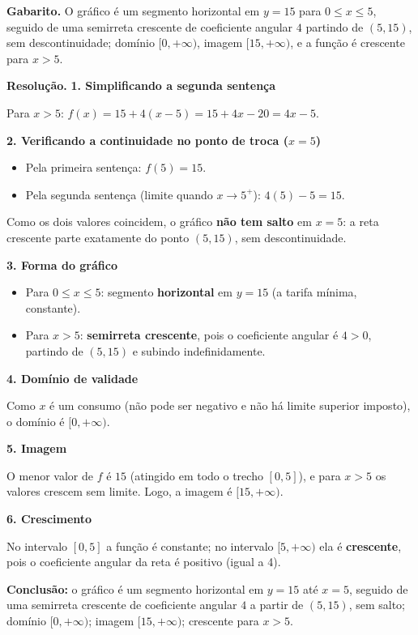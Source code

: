 \documentclass[11pt,a4paper]{article}
\begin{document}
\textbf{Gabarito.} O gráfico é um segmento horizontal em $y=15$ para $0\le x\le 5$, seguido de uma semirreta crescente de coeficiente angular $4$ partindo de $(5,15)$, sem descontinuidade; domínio $[0,+\infty)$, imagem $[15,+\infty)$, e a função é crescente para $x>5$.

\textbf{Resolução.} \textbf{1. Simplificando a segunda sentença}

Para $x>5$: $f(x) = 15 + 4(x-5) = 15 + 4x - 20 = 4x - 5$.

\textbf{2. Verificando a continuidade no ponto de troca ($x=5$)}

\begin{itemize}[nosep,leftmargin=*]
\item Pela primeira sentença: $f(5) = 15$.
\item Pela segunda sentença (limite quando $x\to 5^+$): $4(5)-5 = 15$.
\end{itemize}

Como os dois valores coincidem, o gráfico \textbf{não tem salto} em $x=5$: a reta crescente parte exatamente do ponto $(5,15)$, sem descontinuidade.

\textbf{3. Forma do gráfico}

\begin{itemize}[nosep,leftmargin=*]
\item Para $0 \le x \le 5$: segmento \textbf{horizontal} em $y=15$ (a tarifa mínima, constante).
\item Para $x>5$: \textbf{semirreta crescente}, pois o coeficiente angular é $4>0$, partindo de $(5,15)$ e subindo indefinidamente.
\end{itemize}

\textbf{4. Domínio de validade}

Como $x$ é um consumo (não pode ser negativo e não há limite superior imposto), o domínio é $[0, +\infty)$.

\textbf{5. Imagem}

O menor valor de $f$ é $15$ (atingido em todo o trecho $[0,5]$), e para $x>5$ os valores crescem sem limite. Logo, a imagem é $[15, +\infty)$.

\textbf{6. Crescimento}

No intervalo $[0,5]$ a função é constante; no intervalo $[5,+\infty)$ ela é \textbf{crescente}, pois o coeficiente angular da reta é positivo (igual a 4).

\textbf{Conclusão:} o gráfico é um segmento horizontal em $y=15$ até $x=5$, seguido de uma semirreta crescente de coeficiente angular $4$ a partir de $(5,15)$, sem salto; domínio $[0,+\infty)$; imagem $[15,+\infty)$; crescente para $x>5$.
\end{document}
